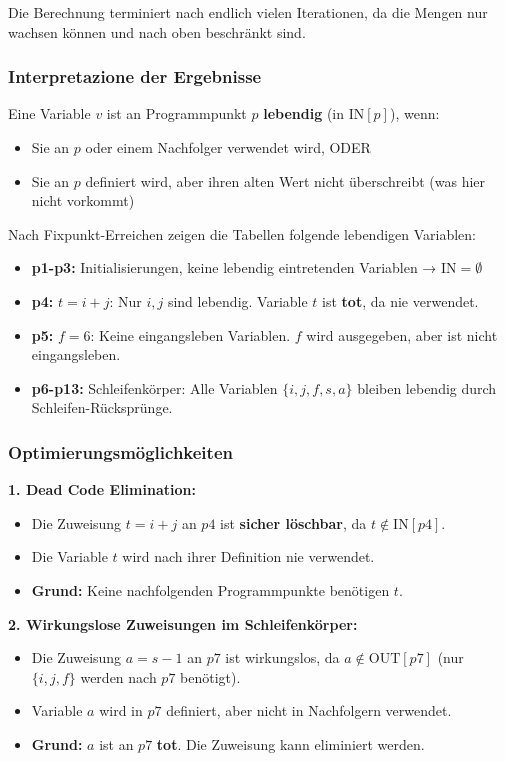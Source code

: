 \documentclass[11pt,a4paper]{article}
\begin{document}
Die Berechnung terminiert nach endlich vielen Iterationen, da die Mengen nur wachsen können und nach oben beschränkt sind.

\subsubsection*{Interpretazione der Ergebnisse}

Eine Variable $v$ ist an Programmpunkt $p$ \textbf{lebendig} (in $\text{IN}[p]$), wenn:
\begin{itemize}
    \item Sie an $p$ oder einem Nachfolger verwendet wird, ODER
    \item Sie an $p$ definiert wird, aber ihren alten Wert nicht überschreibt (was hier nicht vorkommt)
\end{itemize}

Nach Fixpunkt-Erreichen zeigen die Tabellen folgende lebendigen Variablen:

\begin{itemize}
    \item \textbf{p1-p3:} Initialisierungen, keine lebendig eintretenden Variablen → $\text{IN} = \emptyset$
    \item \textbf{p4:} $t = i + j$: Nur $i, j$ sind lebendig. Variable $t$ ist \textbf{tot}, da nie verwendet.
    \item \textbf{p5:} $f = 6$: Keine eingangsleben Variablen. $f$ wird ausgegeben, aber ist nicht eingangsleben.
    \item \textbf{p6-p13:} Schleifenkörper: Alle Variablen $\{i, j, f, s, a\}$ bleiben lebendig durch Schleifen-Rücksprünge.
\end{itemize}

\subsubsection*{Optimierungsmöglichkeiten}

\textbf{1. Dead Code Elimination:}
\begin{itemize}
    \item Die Zuweisung $t = i + j$ an $p4$ ist \textbf{sicher löschbar}, da $t \notin \text{IN}[p4]$.
    \item Die Variable $t$ wird nach ihrer Definition nie verwendet.
    \item \textbf{Grund:} Keine nachfolgenden Programmpunkte benötigen $t$.
\end{itemize}

\textbf{2. Wirkungslose Zuweisungen im Schleifenkörper:}
\begin{itemize}
    \item Die Zuweisung $a = s - 1$ an $p7$ ist wirkungslos, da $a \notin \text{OUT}[p7]$ (nur $\{i,j,f\}$ werden nach $p7$ benötigt).
    \item Variable $a$ wird in $p7$ definiert, aber nicht in Nachfolgern verwendet.
    \item \textbf{Grund:} $a$ ist an $p7$ \textbf{tot}. Die Zuweisung kann eliminiert werden.
\end{itemize}
\end{document}
